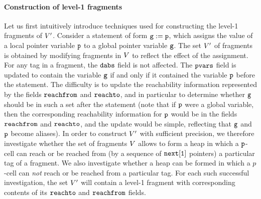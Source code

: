 \paragraph{{\bf Construction of level-1 fragments}}
Let us first intuitively introduce techniques used for constructing the level-1 fragments
of $V'$. Consider a statement of form $\mathtt{g} := \mathtt{p}$,
which assigns the value of a local pointer variable $\mathtt{p}$ to a global
pointer variable $\mathtt{g}$. The set $V'$ of fragments is obtained by
modifying fragments in $V$ to reflect the effect of the assignment. 
For any tag in a fragment, the $\mathtt{dabs}$ field is not affected.
The $\mathtt{pvars}$ field  is updated to contain the variable $\mathtt{g}$ if and only if it contained the variable $\mathtt{p}$ before the statement. 
The difficulty is to update the reachability information represented
by the fields $\mathtt{reachfrom}$ and $\mathtt{reachto}$,
and in particular to determine whether $\mathtt{g}$ should be in such a
set after the statement
(note that if $\mathtt{p}$ were a global variable, then the corresponding
reachability information for $\mathtt{p}$ would be in the fields
$\mathtt{reachfrom}$ and $\mathtt{reachto}$, and the update would be simple,
reflecting that $\mathtt{g}$ and $\mathtt{p}$ become aliases).
In order to construct $V'$ with sufficient precision, we
therefore investigate whether the set of fragments $V$
allows to form a heap in which a $\mathtt{p}$-cell can reach or be
reached from (by a sequence of $\tt next[1]$ pointers)
a particular tag of a fragment.
We also investigate whether a heap can be formed
in which a $p$-cell can {\em not} reach or be reached from a particular tag.
For each such successful investigation,
the set $V'$ will contain a level-1 fragment with
corresponding contents of its $\mathtt{reachto}$ and $\mathtt{reachfrom}$ fields.

